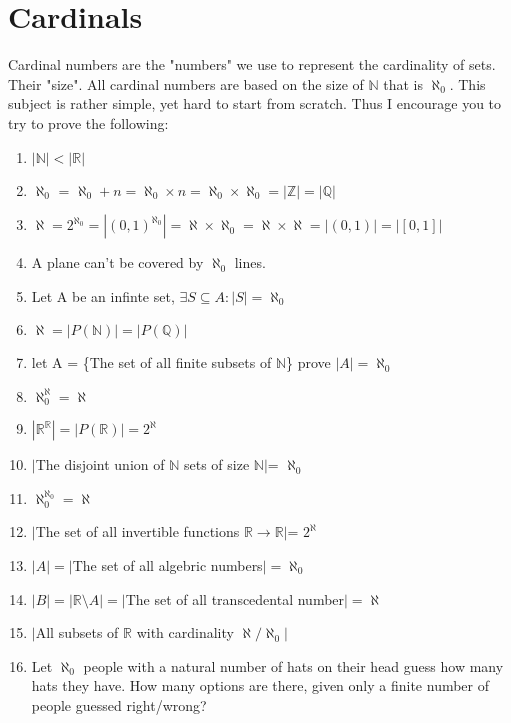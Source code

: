 \documentclass{article}
\newcommand{\N}{\mathbb{N}}
\newcommand{\Z}{\mathbb{Z}}
\newcommand{\Q}{\mathbb{Q}}
\newcommand{\R}{\mathbb{R}}
\begin{document}
\newpage
\section{Cardinals}
Cardinal numbers are the "numbers" we use to represent the cardinality of sets. Their "size".
All cardinal numbers are based on the size of $\N$ that is $\aleph_0$.
This subject is rather simple, yet hard to start from scratch.
Thus I encourage you to try to prove the following:

\begin{enumerate}
    \item $|\N|<|\R|$
    \item $\aleph_{0} $ = $\aleph_{0}+n =\aleph_0\times n=\aleph_0\times\aleph_0=|\Z|=|\Q|$
    \item $\aleph = 2^{\aleph_0} = |(0,1)^{\aleph_0}| = \aleph\times\aleph_0 = \aleph\times\aleph = |(0,1)| = |[0,1]|$
    \item A plane can't be covered by $\aleph_0$ lines.
    \item Let A be an infinte set, $\exists S\subseteq A : |S|=\aleph_0$
    \item $\aleph = |P(\N)|= |P(\Q)|$
    \item let A = \{The set of all finite subsets of $\N$\} prove $|A|=\aleph_0$
    \item $\aleph^\aleph_0=\aleph$
    \item $|\R^\R|=|P(\R)|=2^\aleph$
    \item $|$The disjoint union of $\N$ sets of size $\N|$= $\aleph_0$
    \item $\aleph_0^{\aleph_0} =\aleph$
    \item $|$The set of all invertible functions $\R\rightarrow\R|$= $2^\aleph$
    \item $|A|=|$The set of all algebric numbers$|=\aleph_0$
    \item $|B|=|\R\setminus A|=|$The set of all transcedental number$|=\aleph$
    \item $|$All subsets of $\R$ with cardinality $\aleph/\aleph_0|$
    \item Let $\aleph_0$ people with a natural number of hats on their head guess how many hats they have. How many options are there, given only a finite number of people guessed right/wrong?
    
\end{enumerate}


\newpage
\end{document}
